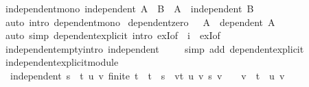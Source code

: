 \begin{isabellebody}
%
\isadelimproof
\isanewline
%
\endisadelimproof
\isanewline
{}\isamarkupfalse%
\ independent{\isacharunderscore}{\kern0pt}mono{\isacharcolon}{\kern0pt}\ {\isachardoublequoteopen}independent\ A\ {\isasymLongrightarrow}\ B\ {\isasymsubseteq}\ A\ {\isasymLongrightarrow}\ independent\ B{\isachardoublequoteclose}\isanewline
%
\isadelimproof
\ \ %
\endisadelimproof
%
\isatagproof
{}\isamarkupfalse%
\ {\isacharparenleft}{\kern0pt}auto\ intro{\isacharcolon}{\kern0pt}\ dependent{\isacharunderscore}{\kern0pt}mono{\isacharparenright}{\kern0pt}%
\endisatagproof
{\isafoldproof}%
%
\isadelimproof
\isanewline
%
\endisadelimproof
\isanewline
{}\isamarkupfalse%
\ dependent{\isacharunderscore}{\kern0pt}zero{\isacharcolon}{\kern0pt}\ {\isachardoublequoteopen}{}\ {\isasymin}\ A\ {\isasymLongrightarrow}\ dependent\ A{\isachardoublequoteclose}\isanewline
%
\isadelimproof
\ \ %
\endisadelimproof
%
\isatagproof
{}\isamarkupfalse%
\ {\isacharparenleft}{\kern0pt}auto\ simp{\isacharcolon}{\kern0pt}\ dependent{\isacharunderscore}{\kern0pt}explicit\ intro{\isacharbang}{\kern0pt}{\isacharcolon}{\kern0pt}\ exI{\isacharbrackleft}{\kern0pt}of\ {\isacharunderscore}{\kern0pt}\ {\isachardoublequoteopen}{\isasymlambda}i{\isachardot}{\kern0pt}\ {}{\isachardoublequoteclose}{\isacharbrackright}{\kern0pt}\ exI{\isacharbrackleft}{\kern0pt}of\ {\isacharunderscore}{\kern0pt}\ {\isachardoublequoteopen}{\isacharbraceleft}{\kern0pt}{}{\isacharbraceright}{\kern0pt}{\isachardoublequoteclose}{\isacharbrackright}{\kern0pt}{\isacharparenright}{\kern0pt}%
\endisatagproof
{\isafoldproof}%
%
\isadelimproof
\isanewline
%
\endisadelimproof
\isanewline
{}\isamarkupfalse%
\ independent{\isacharunderscore}{\kern0pt}empty{\isacharbrackleft}{\kern0pt}intro{\isacharbrackright}{\kern0pt}{\isacharcolon}{\kern0pt}\ {\isachardoublequoteopen}independent\ {\isacharbraceleft}{\kern0pt}{\isacharbraceright}{\kern0pt}{\isachardoublequoteclose}\isanewline
%
\isadelimproof
\ \ %
\endisadelimproof
%
\isatagproof
{}\isamarkupfalse%
\ {\isacharparenleft}{\kern0pt}simp\ add{\isacharcolon}{\kern0pt}\ dependent{\isacharunderscore}{\kern0pt}explicit{\isacharparenright}{\kern0pt}%
\endisatagproof
{\isafoldproof}%
%
\isadelimproof
\isanewline
%
\endisadelimproof
\isanewline
{}\isamarkupfalse%
\ independent{\isacharunderscore}{\kern0pt}explicit{\isacharunderscore}{\kern0pt}module{\isacharcolon}{\kern0pt}\isanewline
\ \ {\isachardoublequoteopen}independent\ s\ {\isasymlongleftrightarrow}\ {\isacharparenleft}{\kern0pt}{\isasymforall}t\ u\ v{\isachardot}{\kern0pt}\ finite\ t\ {\isasymlongrightarrow}\ t\ {\isasymsubseteq}\ s\ {\isasymlongrightarrow}\ {\isacharparenleft}{\kern0pt}{\isasymSum}v{\isasymin}t{\isachardot}{\kern0pt}\ u\ v\ {\isacharasterisk}{\kern0pt}s\ v{\isacharparenright}{\kern0pt}\ {\isacharequal}{\kern0pt}\ {}\ {\isasymlongrightarrow}\ v\ {\isasymin}\ t\ {\isasymlongrightarrow}\ u\ v\ {\isacharequal}{\kern0pt}\ {}{\isacharparenright}{\kern0pt}{\isachardoublequoteclose}\isanewline

\end{isabellebody}
